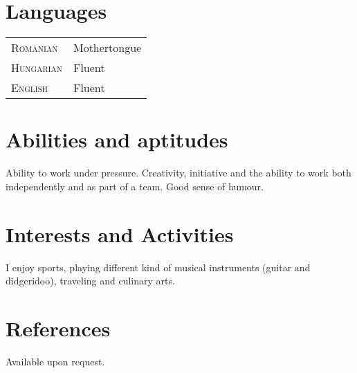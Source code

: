 \documentclass[a4paper,10pt]{article}
\begin{document}
\section{Languages}
\begin{tabular}{p{2.5cm}p{11cm}}
\textsc{Romanian}&Mothertongue\\
\textsc{Hungarian}& Fluent\\
\textsc{English}& Fluent\\
\end{tabular}

\section{Abilities and aptitudes}
Ability to work under pressure.
Creativity, initiative and the ability to work both independently and as part of
a team. Good sense of humour.

\section{Interests and Activities}
I enjoy sports, playing different kind of musical instruments (guitar and
didgeridoo), traveling and culinary arts.

\section{References}
Available upon request.


\end{document}
